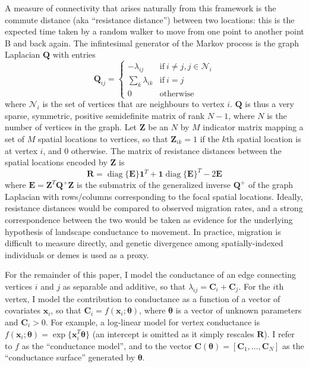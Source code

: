 \documentclass[11pt]{article}
\DeclareMathOperator*{\diag}{diag}
\newcommand{\mat}[1]{\mathbf{#1}}
\begin{document}
A measure of connectivity that arises naturally from this framework is the
commute distance (aka ``resistance distance'') between two locations: this is
the expected time taken by a random walker to move from one point to another
point B and back again. The infintesimal generator of the Markov process is the
graph Laplacian $\mat Q$ with entries
\[
  \mat Q_{ij} = \begin{cases} 
    -\lambda_{ij} & \mathrm{if~} i \neq j, j \in \mathcal{N}_i \\ 
    \sum_k \lambda_{ik} & \mathrm{if~} i = j \\
    0 & \mathrm{otherwise}
  \end{cases}
\]
where $\mathcal{N}_i$ is the set of vertices that are neighbours to vertex $i$.
$\mat Q$ is thus a very sparse, symmetric, positive semidefinite matrix of rank
$N-1$, where $N$ is the number of vertices in the graph. Let $\mat Z$ be an $N$
by $M$ indicator matrix mapping a set of $M$ spatial locations to vertices,
so that $\mat Z_{ik} = 1$ if the $k$th spatial location is at vertex
$i$, and $0$ otherwise. The matrix of resistance distances between the spatial
locations encoded by $\mat Z$ is
\begin{equation}
  \label{resistance}
  \mat R = \diag \{ \mat E \} \mat 1^T + 
           \mat 1 \diag \{\mat E \}^T - 
           2 \mat E
\end{equation}
where $\mat E = \mat Z^T \mat Q^+ \mat Z$ is the submatrix of the generalized
inverse $\mat Q^+$ of the graph Laplacian with rows/columns corresponding
to the focal spatial locations. Ideally, resistance
distances would be compared to observed migration rates, and a strong
correspondence between the two would be taken as evidence for the underlying
hypothesis of landscape conductance to movement. In practice, migration is
difficult to measure directly, and genetic divergence among spatially-indexed
individuals or demes is used as a proxy.

For the remainder of this paper, I model the conductance of an edge connecting
vertices $i$ and $j$ as separable and additive, so that $\lambda_{ij} = \mat
C_i + \mat C_j$. For the $i$th vertex, I model the contribution to conductance
as a function of a vector of covariates $\mat x_i$, so that $\mat C_i = f(\mat
x_i; \bm \theta)$, where $\bm \theta$ is a vector of unknown parameters and
$\mat C_i > 0$.  For example, a log-linear model for vertex conductance is
$f(\mat x_i; \bm \theta) = \exp\{\mat x_i^T \bm \theta\}$ (an intercept is
omitted as it simply rescales $\mat R$). I refer to $f$ as the ``conductance
model'', and to the vector $\mat C(\bm \theta) = [\mat C_1, \dots, \mat C_N]$
as the ``conductance surface'' generated by $\bm \theta$.
\end{document}
